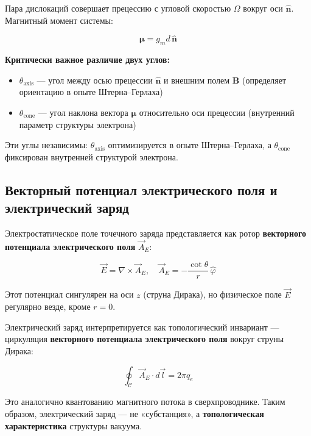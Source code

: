\documentclass[12pt]{article}
\begin{document}
Пара дислокаций совершает прецессию с угловой скоростью $\Omega$ вокруг оси $\hat{\boldsymbol{n}}$. Магнитный момент системы:

\begin{equation}
\boldsymbol{\mu} = g_m d \, \hat{\boldsymbol{n}}
\label{eq:magnetic_moment}
\end{equation}

\textbf{Критически важное различие двух углов:}

\begin{itemize}
\item $\theta_{\text{axis}}$ — угол между осью прецессии $\hat{\boldsymbol{n}}$ и внешним полем $\boldsymbol{B}$ (определяет ориентацию в опыте Штерна–Герлаха)
\item $\theta_{\text{cone}}$ — угол наклона вектора $\boldsymbol{\mu}$ относительно оси прецессии (внутренний параметр структуры электрона)
\end{itemize}

Эти углы независимы: $\theta_{\text{axis}}$ оптимизируется в опыте Штерна–Герлаха, а $\theta_{\text{cone}}$ фиксирован внутренней структурой электрона.

\subsection{Векторный потенциал электрического поля и электрический заряд}

Электростатическое поле точечного заряда представляется как ротор \textbf{векторного потенциала электрического поля} $\vec{A}_E$:

\begin{equation}
\vec{E} = \nabla \times \vec{A}_E, \quad \vec{A}_E = -\frac{\cot\theta}{r} \, \hat{\varphi}
\label{eq:A_E_definition}
\end{equation}

Этот потенциал сингулярен на оси $z$ (струна Дирака), но физическое поле $\vec{E}$ регулярно везде, кроме $r=0$.

Электрический заряд интерпретируется как топологический инвариант — циркуляция \textbf{векторного потенциала электрического поля} вокруг струны Дирака:

\begin{equation}
\oint_{\mathcal{C}} \vec{A}_E \cdot d\vec{l} = 2\pi q_e
\label{eq:charge_circulation_AE}
\end{equation}

Это аналогично квантованию магнитного потока в сверхпроводнике. Таким образом, электрический заряд — не «субстанция», а \textbf{топологическая характеристика} структуры вакуума.
\end{document}
